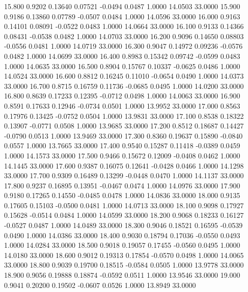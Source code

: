   15.800   0.9202   0.13640   0.07521  -0.0494   0.0487   1.0000  14.0503  33.0000
  15.900   0.9186   0.13860   0.07789  -0.0507   0.0484   1.0000  14.0596  33.0000
  16.000   0.9163   0.14101   0.08091  -0.0522   0.0483   1.0000  14.0664  33.0000
  16.100   0.9133   0.14366   0.08431  -0.0538   0.0482   1.0000  14.0703  33.0000
  16.200   0.9096   0.14650   0.08803  -0.0556   0.0481   1.0000  14.0719  33.0000
  16.300   0.9047   0.14972   0.09236  -0.0576   0.0482   1.0000  14.0699  33.0000
  16.400   0.8983   0.15342   0.09742  -0.0599   0.0483   1.0000  14.0635  33.0000
  16.500   0.8904   0.15767   0.10337  -0.0625   0.0486   1.0000  14.0524  33.0000
  16.600   0.8812   0.16245   0.11010  -0.0654   0.0490   1.0000  14.0373  33.0000
  16.700   0.8715   0.16759   0.11736  -0.0685   0.0495   1.0000  14.0200  33.0000
  16.800   0.8639   0.17233   0.12395  -0.0712   0.0498   1.0000  14.0063  33.0000
  16.900   0.8591   0.17633   0.12946  -0.0734   0.0501   1.0000  13.9952  33.0000
  17.000   0.8563   0.17976   0.13425  -0.0752   0.0504   1.0000  13.9831  33.0000
  17.100   0.8538   0.18322   0.13907  -0.0771   0.0508   1.0000  13.9685  33.0000
  17.200   0.8512   0.18687   0.14427  -0.0790   0.0513   1.0000  13.9469  33.0000
  17.300   0.8360   0.19637   0.15890  -0.0840   0.0557   1.0000  13.7665  33.0000
  17.400   0.9540   0.15287   0.11418  -0.0389   0.0459   1.0000  14.1573  33.0000
  17.500   0.9466   0.15672   0.12009  -0.0408   0.0462   1.0000  14.1445  33.0000
  17.600   0.9387   0.16075   0.12641  -0.0428   0.0466   1.0000  14.1298  33.0000
  17.700   0.9309   0.16489   0.13299  -0.0448   0.0470   1.0000  14.1137  33.0000
  17.800   0.9237   0.16895   0.13951  -0.0467   0.0474   1.0000  14.0976  33.0000
  17.900   0.9180   0.17265   0.14550  -0.0485   0.0478   1.0000  14.0836  33.0000
  18.000   0.9135   0.17605   0.15103  -0.0500   0.0481   1.0000  14.0713  33.0000
  18.100   0.9098   0.17927   0.15628  -0.0514   0.0484   1.0000  14.0599  33.0000
  18.200   0.9068   0.18233   0.16127  -0.0527   0.0487   1.0000  14.0489  33.0000
  18.300   0.9046   0.18521   0.16595  -0.0539   0.0490   1.0000  14.0386  33.0000
  18.400   0.9030   0.18794   0.17036  -0.0550   0.0493   1.0000  14.0284  33.0000
  18.500   0.9018   0.19057   0.17455  -0.0560   0.0495   1.0000  14.0180  33.0000
  18.600   0.9012   0.19313   0.17854  -0.0570   0.0498   1.0000  14.0065  33.0000
  18.800   0.9039   0.19700   0.18515  -0.0584   0.0505   1.0000  13.9778  33.0000
  18.900   0.9056   0.19888   0.18874  -0.0592   0.0511   1.0000  13.9546  33.0000
  19.000   0.9041   0.20200   0.19502  -0.0607   0.0526   1.0000  13.8949  33.0000
